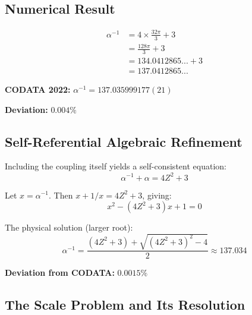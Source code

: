\documentclass[12pt,a4paper]{article}
\newcommand{\Zsq}{Z^2}
\begin{document}
\subsection{Numerical Result}

\begin{align}
\alpha^{-1} &= 4 \times \frac{32\pi}{3} + 3 \\
&= \frac{128\pi}{3} + 3 \\
&= 134.0412865... + 3 \\
&= 137.0412865...
\end{align}

\textbf{CODATA 2022:} $\alpha^{-1} = 137.035999177(21)$

\textbf{Deviation:} $0.004\%$

\subsection{Self-Referential Algebraic Refinement}

Including the coupling itself yields a self-consistent equation:
\begin{equation}
\alpha^{-1} + \alpha = 4\Zsq + 3
\end{equation}

Let $x = \alpha^{-1}$. Then $x + 1/x = 4\Zsq + 3$, giving:
\begin{equation}
x^2 - (4\Zsq + 3)x + 1 = 0
\end{equation}

The physical solution (larger root):
\begin{equation}
\alpha^{-1} = \frac{(4\Zsq + 3) + \sqrt{(4\Zsq + 3)^2 - 4}}{2} \approx 137.034
\end{equation}

\textbf{Deviation from CODATA:} $0.0015\%$

\subsection{The Scale Problem and Its Resolution}
\end{document}
